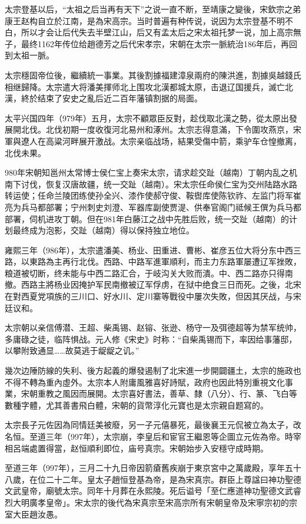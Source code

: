太宗登基以后，“太祖之后当再有天下”之说一直不断，至靖康之變後，宋欽宗之弟康王赵构自立於江南，是為宋高宗。当时普遍有种传说，说因为太宗登基不明不白，所以才会让后代失去半壁江山，后又有孟太后之宋太祖托梦一说，加上高宗無子，最终1162年传位给趙德芳之后代宋孝宗，宋朝在太宗一脈統治186年后，再回到太祖一脈。

太宗穩固帝位後，繼續統一事業。其後割據福建漳泉兩府的陳洪進，割據吳越錢氏相继歸降。太宗遣大将潘美揮师北上围攻北漢都城太原，击退辽国援兵，滅亡北漢，終於结束了安史之亂后近二百年藩镇割据的局面。

太平兴国四年（979年）五月，太宗不顧眾臣反對，趁伐取北漢之勢，從太原出發展開北伐。北伐初期一度收復河北易州和涿州。太宗志得意滿，下令圍攻燕京，宋軍與遼人在高粱河畔展开激战。太宗亲临战场，結果受傷中箭，乘驴车仓惶撤离，北伐未果。

980年宋朝知邕州太常博士侯仁宝上奏宋太宗，请求趁交趾（越南）丁朝内乱之机南下讨伐，恢复汉唐故疆，统一交趾（越南）。宋太宗任命侯仁宝为交州陆路水路转运使；任命兰陵团练使孙全兴、漆作使郝守俊、鞍辔库使陈钦祚、左监门将军崔亮为兵马都部署；宁州刺史刘澄、军器库副使贾湜、供奉官阁门祗候王僎为兵马都部署，伺机进攻丁朝。但在981年白藤江之战中先胜后败，统一交趾（越南）的计划最终成为泡影，交趾（越南）得以保持独立地位。

雍熙三年（986年），太宗遣潘美、杨业、田重进、曹彬、崔彦五位大将分东中西三路，以東路為主再行北伐。西路、中路军進軍順利，而主力东路軍屡遭辽军挫敗，粮道被切断，终未能与中西二路汇合，于岐沟关大败而潰。中、西二路亦只得南撤。西路主將杨业因掩护军民南撤被辽军俘虏，在狱中绝食三日而死。之後，北宋在對西夏党項族的三川口、好水川、定川寨等戰役中屢次失敗，但因其厌战，与宋廷议和。

太宗朝以亲信傅潜、王超、柴禹锡、赵镕、张逊、杨守一及弭德超等为禁军统帅，多庸碌之徒，临阵惧战。元人修《宋史》时称：“自柴禹锡而下，率因给事藩邸，以攀附致通显……故莫逃于龊龊之讥。”

幾次边陲防線的失利、後方起義的爆發遏制了北宋進一步開闢疆土，太宗的施政也不得不轉為重內虛外。太宗本人附庸風雅喜好詩賦，政府也因此特別重視文化事業，宋朝重教之風因而展開。太宗喜好書法，善草、隸（八分）、行、篆、飞白等數種字體，尤其善書飛白體，宋朝的貨幣淳化元寶也是太宗親自题寫的。

太宗長子元佐因為同情廷美被廢，另一子元僖暴死，最後襄王元侃被立為太子，改名恒。至道三年（997年），太宗崩，李皇后和宦官王繼恩等企圖立元佐為帝。時宰相呂端處置得當，赵恒順利即位，庙号真宗。宋朝始步入安穩守成時期。

至道三年（997年），三月二十九日帝因箭瘡舊疾崩于東京宮中之萬歲殿，享年五十八歲，在位二十二年。皇太子趙恒登基為帝，是為宋真宗。群臣上尊諡曰神功聖德文武皇帝，廟號太宗。同年十月葬在永熙陵。死后谥号「至仁應道神功聖德文武睿烈大明廣孝皇帝」。宋太宗的後代為宋真宗至宋高宗所有宋朝皇帝及宋寧宗初的宗室大臣趙汝愚。

